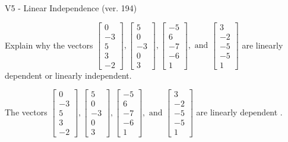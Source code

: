 \begin{exercise}
  \begin{exerciseTitle}V5 - Linear Independence (ver. 194)\end{exerciseTitle}
  \begin{exerciseStatement}
    Explain why the vectors \(\left[\begin{array}{r}
0 \\
-3 \\
5 \\
3 \\
-2
\end{array}\right] , \left[\begin{array}{r}
5 \\
0 \\
-3 \\
0 \\
3
\end{array}\right] , \left[\begin{array}{r}
-5 \\
6 \\
-7 \\
-6 \\
1
\end{array}\right] , \text{ and } \left[\begin{array}{r}
3 \\
-2 \\
-5 \\
-5 \\
1
\end{array}\right]\) are linearly dependent or linearly independent.	


  \end{exerciseStatement}
  \begin{exerciseAnswer}
   The vectors \(\left[\begin{array}{r}
0 \\
-3 \\
5 \\
3 \\
-2
\end{array}\right] , \left[\begin{array}{r}
5 \\
0 \\
-3 \\
0 \\
3
\end{array}\right] , \left[\begin{array}{r}
-5 \\
6 \\
-7 \\
-6 \\
1
\end{array}\right] , \text{ and } \left[\begin{array}{r}
3 \\
-2 \\
-5 \\
-5 \\
1
\end{array}\right]\) are 
  	 linearly dependent  .
  


  \end{exerciseAnswer}
\end{exercise}